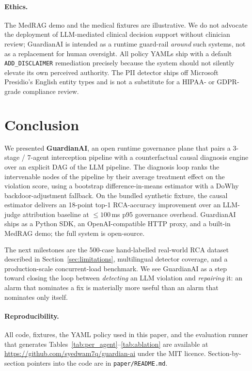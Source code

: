 \documentclass[11pt,letterpaper]{article}
\begin{document}
\paragraph{Ethics.}
The MedRAG demo and the medical fixtures are illustrative.  We do not
advocate the deployment of LLM-mediated clinical decision support
without clinician review; GuardianAI is intended as a runtime
guard-rail \emph{around} such systems, not as a replacement for human
oversight.  All policy YAMLs ship with a default \texttt{ADD\_DISCLAIMER}
remediation precisely because the system should not silently elevate
its own perceived authority.  The PII detector ships off Microsoft
Presidio's English entity types and is not a substitute for a HIPAA-
or GDPR-grade compliance review.

\section{Conclusion}
\label{sec:conclusion}

We presented \textbf{GuardianAI}, an open runtime governance plane
that pairs a 3-stage / 7-agent interception pipeline with a
counterfactual causal diagnosis engine over an explicit DAG of the
LLM pipeline.  The diagnosis loop ranks the intervenable nodes of
the pipeline by their average treatment effect on the violation
score, using a bootstrap difference-in-means estimator with a DoWhy
backdoor-adjustment fallback.  On the bundled synthetic fixture, the
causal estimator delivers an 18-point top-1 RCA-accuracy improvement
over an LLM-judge attribution baseline at $\le 100$\,ms p95 governance
overhead.  GuardianAI ships as a Python SDK, an OpenAI-compatible HTTP
proxy, and a built-in MedRAG demo; the full system is open-source.

The next milestones are the 500-case hand-labelled real-world RCA
dataset described in Section~\ref{sec:limitations}, multilingual
detector coverage, and a production-scale concurrent-load benchmark.
We see GuardianAI as a step toward closing the loop between
\emph{detecting} an LLM violation and \emph{repairing} it: an alarm
that nominates a fix is materially more useful than an alarm that
nominates only itself.

\paragraph{Reproducibility.}
All code, fixtures, the YAML policy used in this paper, and the
evaluation runner that generates Tables~\ref{tab:per_agent}--\ref{tab:ablation}
are available at \url{https://github.com/syedwam7q/guardian-ai} under
the MIT licence.  Section-by-section pointers into the code are in
\texttt{paper/README.md}.



\end{document}
